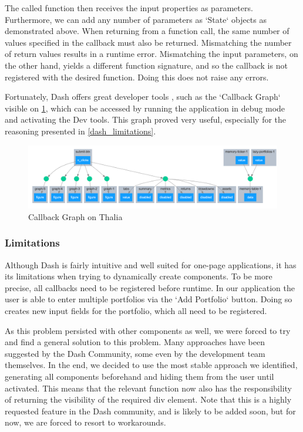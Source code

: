 \documentclass[main.tex]{subfiles}
\begin{document}
The called function then receives the input properties as parameters. Furthermore, we can add any number of parameters as `State` objects as demonstrated above. When returning from a function call, the same number of values specified in the callback must also be returned. Mismatching the number of return values results in a runtime error. Mismatching the input parameters, on the other hand, yields a different function signature, and so the callback is not registered with the desired function. Doing this does not raise any errors.


Fortunately, Dash offers great developer tools \cite{dash_dev_tools}, such as the `Callback Graph` visible on \figurename{\ref{callback_graph}}, which can be accessed by running the application in debug mode and activating the Dev tools. This graph proved very useful, especially for the reasoning presented in \ref{dash_limitations}.

 \begin{figure}[H]
   \centering
   \includegraphics[width=\textwidth,keepaspectratio]{05Coding/05Pictures/callback_graph.png}
   \caption{Callback Graph on Thalia}
   \label{callback_graph}
\end{figure}


\subsubsection*{Limitations}
\label{dash_limitations}

Although Dash is fairly intuitive and well suited for one-page applications, it has its limitations when trying to dynamically create components. To be more precise, all callbacks need to be registered before runtime. In our application the user is able to enter multiple portfolios via the `Add Portfolio` button. Doing so creates new input fields for the portfolio, which all need to be registered. 

As this problem persisted with other components as well, we were forced to try and find a general solution to this problem. Many approaches have been suggested by the Dash Community, some even by the development team themselves\cite{dash_workaround}. In the end, we decided to use the most stable approach we identified, generating all components beforehand and hiding them from the user until activated. This means that the relevant function now also has the responsibility of returning the visibility of the required div element. Note that this is a highly requested feature in the Dash community, and is likely to be added soon, but for now, we are forced to resort to workarounds.
\end{document}
